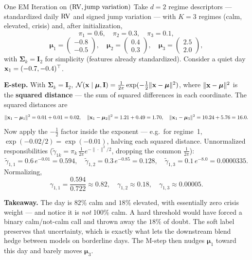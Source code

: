 \begin{workedexample}{One EM Iteration on $(\operatorname{RV}, \text{jump variation})$}
Take $d=2$ regime descriptors --- standardized daily $\operatorname{RV}$ and signed jump
variation --- with $K=3$ regimes (calm, elevated, crisis) and, after
initialization,
\[
  \pi_1 = 0.6,\quad \pi_2 = 0.3,\quad \pi_3 = 0.1,
\]
\[
  \bm{\mu}_1 = \begin{pmatrix} -0.8 \\ -0.5 \end{pmatrix}\!,\quad
  \bm{\mu}_2 = \begin{pmatrix} 0.4 \\ 0.3 \end{pmatrix}\!,\quad
  \bm{\mu}_3 = \begin{pmatrix} 2.5 \\ 2.0 \end{pmatrix}\!,
\]
with $\bm{\Sigma}_k = \mathbf{I}_2$ for simplicity (features already
standardized).  Consider a quiet day $\mathbf{x}_1 = (-0.7, -0.4)^\top$.

\textbf{E-step.}  With $\bm{\Sigma}_k=\mathbf{I}_2$,
$\mathcal{N}(\mathbf{x} \mid \bm{\mu}, \mathbf{I}) = \tfrac{1}{2\pi}\exp(-\tfrac12\|\mathbf{x}-\bm{\mu}\|^2)$,
where $\|\mathbf{x}-\bm{\mu}\|^2$ is the \textbf{squared distance} --- the sum of
squared differences in each coordinate.  The squared distances are
\[
  \|\mathbf{x}_1 - \bm{\mu}_1\|^2 = 0.01 + 0.01 = 0.02,\quad
  \|\mathbf{x}_1 - \bm{\mu}_2\|^2 = 1.21 + 0.49 = 1.70,\quad
  \|\mathbf{x}_1 - \bm{\mu}_3\|^2 = 10.24 + 5.76 = 16.0.
\]
Now apply the $-\tfrac12$ factor inside the exponent --- e.g.\ for regime~1,
$\exp(-0.02/2) = \exp(-0.01)$, halving each squared distance.  Unnormalized
responsibilities ($\tilde\gamma_{1k} = \pi_k\,\tfrac{1}{2\pi}e^{-\|\cdot\|^2/2}$,
dropping the common $\tfrac{1}{2\pi}$):
\[
  \tilde\gamma_{1,1} = 0.6\,e^{-0.01} = 0.594,\quad
  \tilde\gamma_{1,2} = 0.3\,e^{-0.85} = 0.128,\quad
  \tilde\gamma_{1,3} = 0.1\,e^{-8.0} = 0.0000335.
\]
Normalizing,
\[
  \gamma_{1,1} = \frac{0.594}{0.722} \approx 0.82,\quad
  \gamma_{1,2} \approx 0.18,\quad
  \gamma_{1,3} \approx 0.00005.
\]

\textbf{Takeaway.}  The day is $82\%$ calm and $18\%$ elevated, with
essentially zero crisis weight --- and notice it is \emph{not} 100\% calm.
A hard threshold would have forced a binary calm/not-calm call and thrown
away the $18\%$ of doubt.  The soft label preserves that uncertainty,
which is exactly what lets the downstream blend hedge between models on
borderline days.  The M-step then nudges $\bm{\mu}_1$ toward this day and
barely moves $\bm{\mu}_3$.
\end{workedexample}

